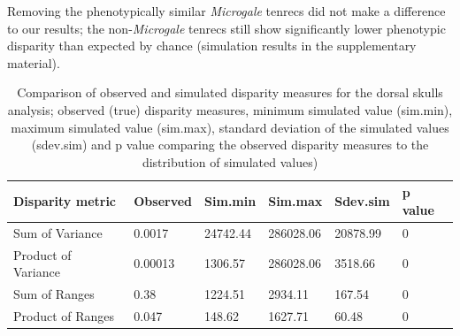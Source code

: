 \documentclass[12pt,a4paper]{article}
\begin{document}
Removing the phenotypically similar \textit{Microgale} tenrecs did not make a difference to our results; the non-\textit{Microgale} tenrecs still show significantly lower phenotypic disparity than expected by chance (simulation results in the supplementary material). 



\begin{table}[H]				%

\centering
\caption{Comparison of observed and simulated disparity measures for the dorsal skulls analysis; observed (true) disparity measures, minimum simulated value (sim.min), maximum simulated value (sim.max), standard deviation of the simulated values (sdev.sim) and p value comparing the observed disparity measures to the distribution of simulated values)}

\begin{tabular}[t]{l l l l l l }		%
\hline
\textbf{Disparity metric} & \textbf{Observed} & \textbf{Sim.min} & \textbf{Sim.max} & \textbf{Sdev.sim} & \textbf{p value} \\
\hline
Sum of Variance & 0.0017 & 24742.44 & 286028.06 & 20878.99 &	0\\
Product of Variance	& 0.00013 &	1306.57 &	286028.06 &	3518.66 & 0\\
Sum of Ranges &	0.38 &	1224.51 &	2934.11 &	167.54 & 0 \\
Product of Ranges & 0.047 &	148.62 & 1627.71 &	60.48 &	0\\
\hline
\end{tabular}
\label{skdorssims} %
\end{table}
\end{document}
